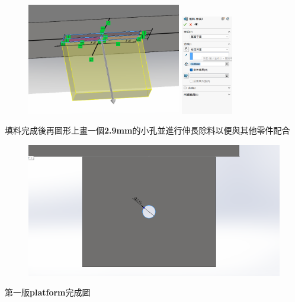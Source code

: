 \begin{figure}[h!]
    \centering
    \includegraphics[width=0.6\textwidth]{./../images/6-1-16.png}
    \includegraphics[width=0.2\textwidth]{./../images/6-1-17.png}
\end{figure}

\noindent 填料完成後再圖形上畫一個\textbf{2.9mm}的小孔並進行伸長除料以便與其他零件配合

\begin{figure}[h!]
    \centering
    \includegraphics[width=1\textwidth]{./../images/6-1-18.png}
\end{figure}

\noindent 第一版\textbf{platform}完成圖

